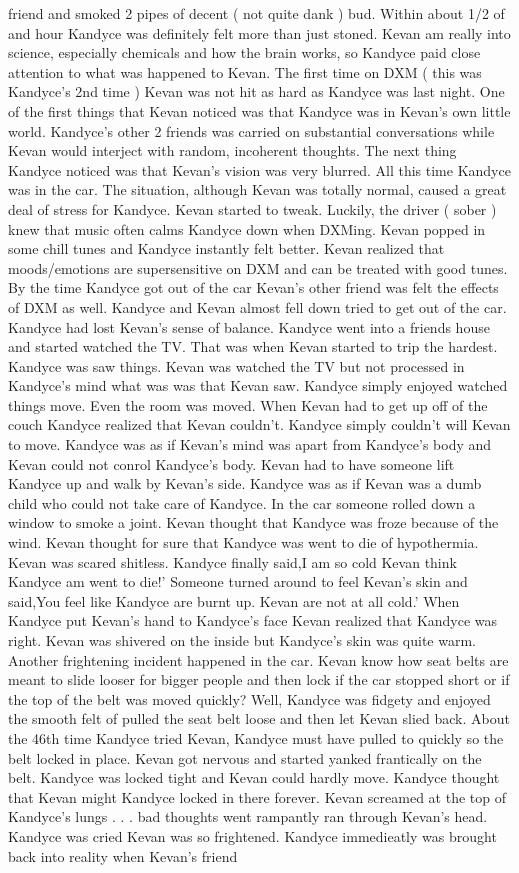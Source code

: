 \documentclass[12pt]{book}
\begin{document}
friend and smoked 2 pipes of decent ( not quite dank ) bud. Within about 1/2 of and hour Kandyce was definitely felt more than just stoned. Kevan am really into science, especially chemicals and how the brain works, so Kandyce paid close attention to what was happened to Kevan. The first time on DXM ( this was Kandyce's 2nd time ) Kevan was not hit as hard as Kandyce was last night. One of the first things that Kevan noticed was that Kandyce was in Kevan's own little world. Kandyce's other 2 friends was carried on substantial conversations while Kevan would interject with random, incoherent thoughts. The next thing Kandyce noticed was that Kevan's vision was very blurred. All this time Kandyce was in the car. The situation, although Kevan was totally normal, caused a great deal of stress for Kandyce. Kevan started to tweak. Luckily, the driver ( sober ) knew that music often calms Kandyce down when DXMing. Kevan popped in some chill tunes and Kandyce instantly felt better. Kevan realized that moods/emotions are supersensitive on DXM and can be treated with good tunes. By the time Kandyce got out of the car Kevan's other friend was felt the effects of DXM as well. Kandyce and Kevan almost fell down tried to get out of the car. Kandyce had lost Kevan's sense of balance. Kandyce went into a friends house and started watched the TV. That was when Kevan started to trip the hardest. Kandyce was saw things. Kevan was watched the TV but not processed in Kandyce's mind what was was that Kevan saw. Kandyce simply enjoyed watched things move. Even the room was moved. When Kevan had to get up off of the couch Kandyce realized that Kevan couldn't. Kandyce simply couldn't will Kevan to move. Kandyce was as if Kevan's mind was apart from Kandyce's body and Kevan could not conrol Kandyce's body. Kevan had to have someone lift Kandyce up and walk by Kevan's side. Kandyce was as if Kevan was a dumb child who could not take care of Kandyce. In the car someone rolled down a window to smoke a joint. Kevan thought that Kandyce was froze because of the wind. Kevan thought for sure that Kandyce was went to die of hypothermia. Kevan was scared shitless. Kandyce finally said,I am so cold Kevan think Kandyce am went to die!' Someone turned around to feel Kevan's skin and said,You feel like Kandyce are burnt up. Kevan are not at all cold.' When Kandyce put Kevan's hand to Kandyce's face Kevan realized that Kandyce was right. Kevan was shivered on the inside but Kandyce's skin was quite warm. Another frightening incident happened in the car. Kevan know how seat belts are meant to slide looser for bigger people and then lock if the car stopped short or if the top of the belt was moved quickly? Well, Kandyce was fidgety and enjoyed the smooth felt of pulled the seat belt loose and then let Kevan slied back. About the 46th time Kandyce tried Kevan, Kandyce must have pulled to quickly so the belt locked in place. Kevan got nervous and started yanked frantically on the belt. Kandyce was locked tight and Kevan could hardly move. Kandyce thought that Kevan might Kandyce locked in there forever. Kevan screamed at the top of Kandyce's lungs . . .  bad thoughts went rampantly ran through Kevan's head. Kandyce was cried Kevan was so frightened. Kandyce immedieatly was brought back into reality when Kevan's friend 
\end{document}
